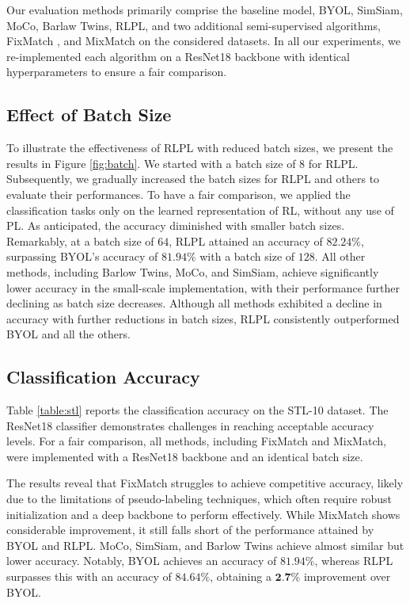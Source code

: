 Our evaluation methods primarily comprise the baseline model, BYOL, SimSiam, MoCo, Barlaw Twins, RLPL, and two additional semi-supervised algorithms, FixMatch \cite{sohn2020fixmatch}, and MixMatch \cite{berthelot2019mixmatch} on the considered datasets. In all our experiments, we re-implemented each algorithm on a ResNet18 backbone with identical hyperparameters to ensure a fair comparison.

\subsection{Effect of Batch Size}

To illustrate the effectiveness of RLPL with reduced batch sizes, we present the results in Figure \ref{fig:batch}. We started with a batch size of $8$ for RLPL. Subsequently, we gradually increased the batch sizes for RLPL and others to evaluate their performances. To have a fair comparison, we applied the classification tasks only on the learned representation of RL, without any use of PL. As anticipated, the accuracy diminished with smaller batch sizes. Remarkably, at a batch size of $64$, RLPL attained an accuracy of $82.24\%$, surpassing BYOL's accuracy of $81.94\%$ with a batch size of $128$. All other methods, including Barlow Twins, MoCo, and SimSiam, achieve significantly lower accuracy in the small-scale implementation, with their performance further declining as batch size decreases. Although all methods exhibited a decline in accuracy with further reductions in batch sizes, RLPL consistently outperformed BYOL and all the others.

\subsection{Classification Accuracy}

Table \ref{table:stl} reports the classification accuracy on the STL-10 dataset. The ResNet18 classifier demonstrates challenges in reaching acceptable accuracy levels. For a fair comparison, all methods, including FixMatch and MixMatch, were implemented with a ResNet18 backbone and an identical batch size.

The results reveal that FixMatch struggles to achieve competitive accuracy, likely due to the limitations of pseudo-labeling techniques, which often require robust initialization and a deep backbone to perform effectively. While MixMatch shows considerable improvement, it still falls short of the performance attained by BYOL and RLPL. MoCo, SimSiam, and Barlow Twins achieve almost similar but lower accuracy. Notably, BYOL achieves an accuracy of $81.94\%$, whereas RLPL surpasses this with an accuracy of $84.64\%$, obtaining a $\textbf{2.7\%}$ improvement over BYOL.

